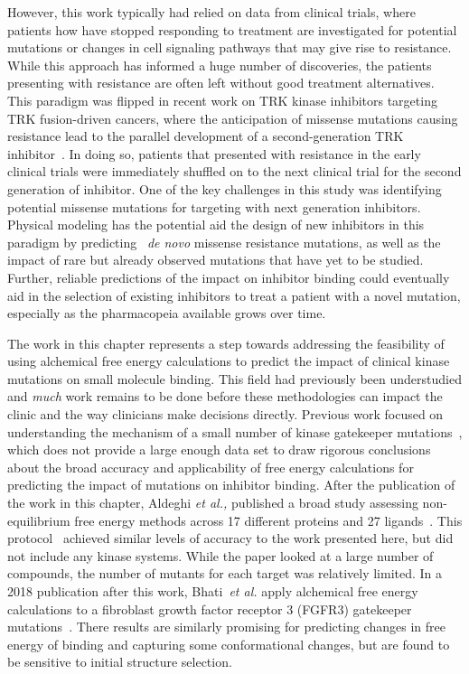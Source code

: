 \documentclass[phd,tocprelim]{cornell}
\begin{document}
However, this work typically had relied on data from clinical trials, where patients how have stopped responding to treatment are investigated for potential mutations or changes in cell signaling pathways that may give rise to resistance. While this approach has informed a huge number of discoveries, the patients presenting with resistance are often left without good treatment alternatives. This paradigm was flipped in recent work on TRK kinase inhibitors targeting TRK fusion-driven cancers, where the anticipation of missense mutations causing resistance lead to the parallel development of a second-generation TRK inhibitor~\citep{Drilon:2017gb}. In doing so, patients that presented with resistance in the early clinical trials were immediately shuffled on to the next clinical trial for the second generation of inhibitor. One of the key challenges in this study was identifying potential missense mutations for targeting with next generation inhibitors. Physical modeling has the potential aid the design of new inhibitors in this paradigm by predicting ~\emph{de novo} missense resistance mutations, as well as the impact of rare but already observed mutations that have yet to be studied. Further, reliable predictions of the impact on inhibitor binding could eventually aid in the selection of existing inhibitors to treat a patient with a novel mutation, especially as the pharmacopeia available grows over time. 

The work in this chapter represents a step towards addressing the feasibility of using alchemical free energy calculations to predict the impact of clinical kinase mutations on small molecule binding. This field had previously been understudied and \emph{much} work remains to be done before these methodologies can impact the clinic and the way clinicians make decisions directly. Previous work focused on understanding the mechanism of a small number of kinase gatekeeper mutations~\citep{Mondal:2016ju}, which does not provide a large enough data set to draw rigorous conclusions about the broad accuracy and applicability of free energy calculations for predicting the impact of mutations on inhibitor binding. After the publication of the work in this chapter, Aldeghi \emph{et al.,} published a broad study assessing non-equilibrium free energy methods across 17 different proteins and 27 ligands~\citep{Aldeghi:2018fz}. 
This protocol~\citep{Aldeghi:2018ej} achieved similar levels of accuracy to the work presented here, but did not include any kinase systems. While the paper looked at a large number of compounds, the number of mutants for each target was relatively limited. In a 2018 publication after this work, Bhati~\emph{et al.} apply alchemical free energy calculations to a fibroblast growth factor receptor 3 (FGFR3) gatekeeper mutations~\citep{Bhati:2018dl}. There results are similarly promising for predicting changes in free energy of binding and capturing some conformational changes, but are found to be sensitive to initial structure selection. 
\end{document}
